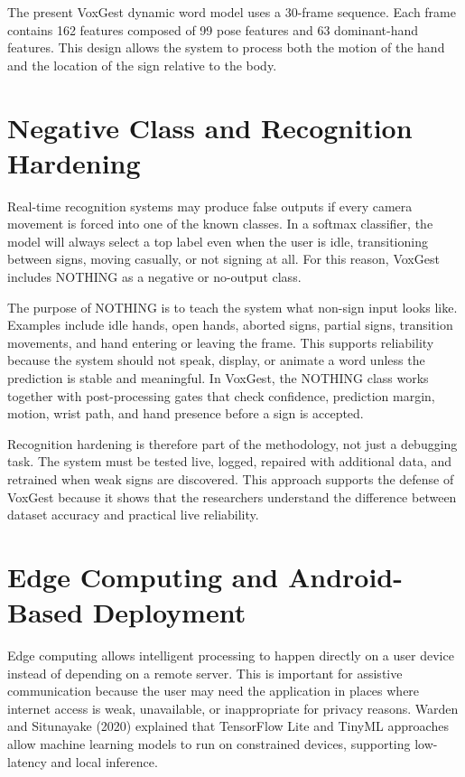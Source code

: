 The present VoxGest dynamic word model uses a 30-frame sequence. Each frame contains 162 features composed of 99 pose features and 63 dominant-hand features. This design allows the system to process both the motion of the hand and the location of the sign relative to the body.

\section{Negative Class and Recognition Hardening}

Real-time recognition systems may produce false outputs if every camera movement is forced into one of the known classes. In a softmax classifier, the model will always select a top label even when the user is idle, transitioning between signs, moving casually, or not signing at all. For this reason, VoxGest includes NOTHING as a negative or no-output class.

The purpose of NOTHING is to teach the system what non-sign input looks like. Examples include idle hands, open hands, aborted signs, partial signs, transition movements, and hand entering or leaving the frame. This supports reliability because the system should not speak, display, or animate a word unless the prediction is stable and meaningful. In VoxGest, the NOTHING class works together with post-processing gates that check confidence, prediction margin, motion, wrist path, and hand presence before a sign is accepted.

Recognition hardening is therefore part of the methodology, not just a debugging task. The system must be tested live, logged, repaired with additional data, and retrained when weak signs are discovered. This approach supports the defense of VoxGest because it shows that the researchers understand the difference between dataset accuracy and practical live reliability.

\section{Edge Computing and Android-Based Deployment}

Edge computing allows intelligent processing to happen directly on a user device instead of depending on a remote server. This is important for assistive communication because the user may need the application in places where internet access is weak, unavailable, or inappropriate for privacy reasons. Warden and Situnayake (2020) explained that TensorFlow Lite and TinyML approaches allow machine learning models to run on constrained devices, supporting low-latency and local inference.

